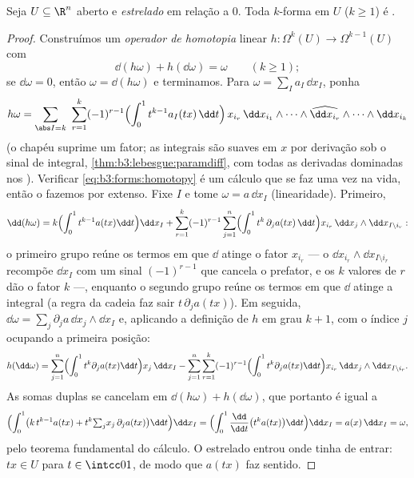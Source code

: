 \begin{theorem}\label{thm:b3:forms:poincare}
Seja $U \subseteq \R^n$ aberto e \emph{estrelado} em relação a $0$. Toda
$k$-forma  em $U$ ($k \geq 1$) é .
\end{theorem}

\begin{proof}
Construímos um \emph{operador de homotopia} linear $h\colon
\Omega^k(U) \to \Omega^{k-1}(U)$ com
\begin{equation}\label{eq:b3:forms:homotopy}
\dd(h\omega) + h(\dd\omega) = \omega
\qquad (k \geq 1);
\end{equation}
se $\dd\omega = 0$, então $\omega = \dd(h\omega)$ e terminamos. Para $\omega = \sum_I a_I\,\dd x_I$, ponha
\[
h\omega = \sum_{\abs I = k}\ \sum_{r=1}^{k}(-1)^{r-1}
\Bigl(\int_0^1 t^{k-1}a_I(tx)\,\dd t\Bigr)\,
x_{i_r}\,\dd x_{i_1}\wedge\dots\wedge
\widehat{\dd x_{i_r}}\wedge\dots\wedge\dd x_{i_k}
\]
(o chapéu suprime um fator; as integrais são suaves em $x$ por
derivação sob o sinal de integral, \cref{thm:b3:lebesgue:paramdiff}, com todas as
derivadas dominadas nos ). Verificar \eqref{eq:b3:forms:homotopy} é um cálculo que se
faz uma vez na vida, então o fazemos por extenso. Fixe $I$ e tome
$\omega =
a\,\dd x_I$ (linearidade). Primeiro,
\[
\dd(h\omega) = k\Bigl(\int_0^1t^{k-1}a(tx)\dd t\Bigr)\dd x_I
+ \sum_{r=1}^k(-1)^{r-1}\sum_{j=1}^n
\Bigl(\int_0^1t^{k}\,\partial_ja(tx)\,\dd t\Bigr)
x_{i_r}\,\dd x_j\wedge\dd x_{I\setminus i_r} :
\]
o primeiro grupo reúne os termos em que $\dd$ atinge o fator $x_{i_r}$
--- o  $\dd x_{i_r}\wedge\dd
x_{I\setminus i_r}$ recompõe $\dd x_I$ com um sinal $(-1)^{r-1}$ que
cancela o prefator, e os $k$ valores de $r$ dão o fator $k$
---, enquanto o segundo grupo reúne os termos em que $\dd$ atinge a
integral (a regra da cadeia faz sair $t\,\partial_ja(tx)$). Em seguida, $\dd\omega =
\sum_j\partial_ja\,\dd x_j\wedge\dd x_I$ e,
aplicando a definição de $h$ em grau $k+1$, com o índice $j$
ocupando a primeira posição:
\[
h(\dd\omega) = \sum_{j=1}^n\Bigl(\int_0^1t^{k}
\partial_ja(tx)\dd t\Bigr)x_j\,\dd x_I
- \sum_{j=1}^n\sum_{r=1}^k(-1)^{r-1}
\Bigl(\int_0^1t^{k}\partial_ja(tx)\dd t\Bigr)
x_{i_r}\,\dd x_j\wedge\dd x_{I\setminus i_r} .
\]
As somas duplas se cancelam em $\dd(h\omega) + h(\dd\omega)$, que portanto é igual a
\[
\Bigl(\int_0^1\bigl(k\,t^{k-1}a(tx) +
t^k{\textstyle\sum_j}x_j\,\partial_ja(tx)\bigr)\dd t\Bigr)
\dd x_I
= \Bigl(\int_0^1\frac{\dd}{\dd t}\bigl(t^ka(tx)\bigr)\dd
t\Bigr)\dd x_I
= a(x)\,\dd x_I = \omega,
\]
pelo teorema fundamental do cálculo. O  estrelado entrou onde
tinha de entrar: $tx \in U$ para $t \in \intcc01$, de modo que $a(tx)$ faz sentido.
\end{proof}

